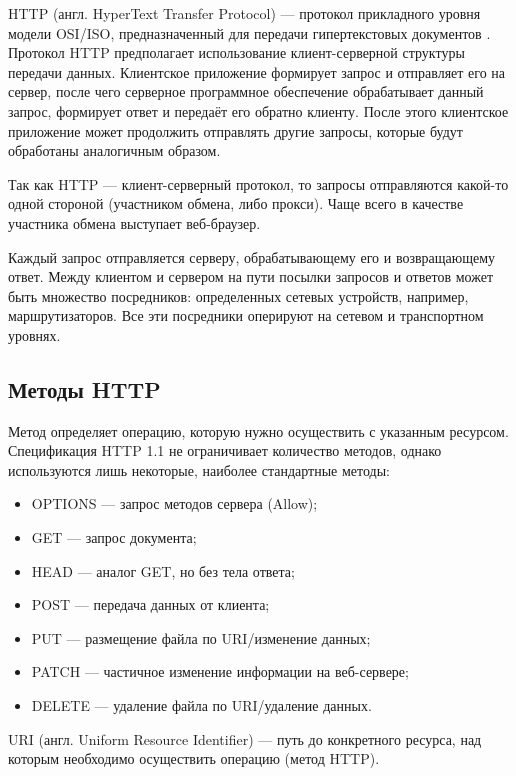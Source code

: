 HTTP (англ. HyperText Transfer Protocol) --- протокол прикладного уровня модели OSI/ISO, предназначенный для передачи гипертекстовых документов \cite{gourley2002http}. Протокол HTTP предполагает использование клиент-серверной структуры передачи данных. Клиентское приложение формирует запрос и отправляет его на сервер, после чего серверное программное обеспечение обрабатывает данный запрос, формирует ответ и передаёт его обратно клиенту. После этого клиентское приложение может продолжить отправлять другие запросы, которые будут обработаны аналогичным образом.

\clearpage

Так как HTTP --- клиент-серверный протокол, то запросы отправляются какой-то одной стороной (участником обмена, либо прокси). Чаще всего в качестве участника обмена выступает веб-браузер.

Каждый запрос отправляется серверу, обрабатывающему его и возвращающему ответ. Между клиентом и сервером на пути посылки запросов и ответов может быть множество посредников: определенных сетевых устройств, например, маршрутизаторов. Все эти посредники оперируют на сетевом и транспортном уровнях.

\subsection{Методы HTTP}

Метод определяет операцию, которую нужно осуществить с указанным ресурсом. Спецификация HTTP 1.1 не ограничивает количество методов, однако используются лишь некоторые, наиболее стандартные методы:

\begin{itemize}[label=---]
    \item OPTIONS --- запрос методов сервера (Allow);
    \item GET --- запрос документа;
    \item HEAD --- аналог GET, но без тела ответа;
    \item POST --- передача данных от клиента;
    \item PUT --- размещение файла по URI/изменение данных;
    \item PATCH --- частичное изменение информации на веб-сервере;
    \item DELETE --- удаление файла по URI/удаление данных.
\end{itemize}

URI (англ. Uniform Resource Identifier) --- путь до конкретного ресурса, над которым необходимо осуществить операцию (метод HTTP).
